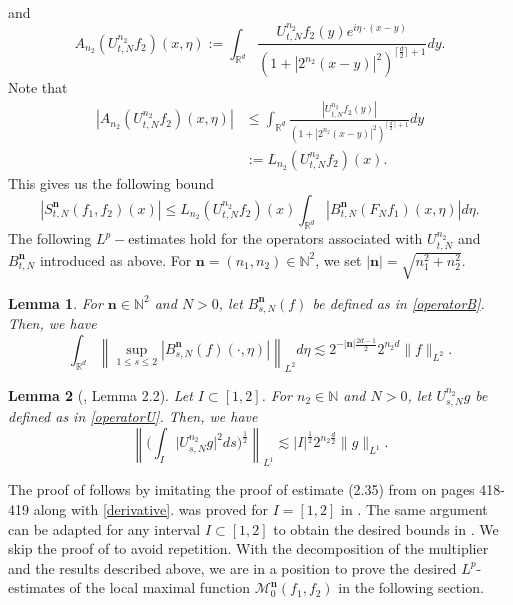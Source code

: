 \documentclass[a4paper,reqno]{amsart}
\newtheorem{lemma}{Lemma}[section]
\newcounter{old}
\numberwithin{equation}{section}
\newcommand{\N}{{\mathbb N}}
\begin{document}
	and
	\[A_{n_2}\left(U^{n_2}_{t,N}f_2\right)(x,\eta):=\int_{\mathbb{R}^{d}} \frac{U^{n_2}_{t,N}f_2(y)e^{i\eta\cdot(x-y)}}{\left(1+\left|2^{n_2}(x-y)\right|^{2}\right)^{\lceil \frac{d}{2}\rceil+1}} d y.\]
	Note that
	\begin{align*}
		\left|A_{n_2}\left(U^{n_2}_{t,N}f_2\right)(x,\eta)\right|&\leq\int_{\mathbb{R}^{d}} \frac{|U^{n_2}_{t,N}f_2(y)|}{\left(1+\left|2^{n_2}(x-y)\right|^{2}\right)^{\lceil \frac{d}{2}\rceil+1}} d y\\
		&:=L_{n_2}\left(U_{t,N}^{n_2}f_2\right)(x).
	\end{align*}
	This gives us the following bound
	\begin{equation}\label{decomposition}
		|S^{\mathbf{n}}_{t,N}(f_1,f_2)(x)|\leq L_{n_2}\left(U_{t,N}^{n_2}f_2\right)(x) \int_{\mathbb{R}^{d}}\left|B^{\mathbf{n}}_{t,N}\left(F_Nf_1\right)(x, \eta)\right| d \eta.
	\end{equation}
	The following $L^p-$estimates hold for the operators associated with $U_{t,N}^{n_2}$ and $B^{\mathbf{n}}_{t,N}$ introduced as above. For $\mathbf{n}=(n_1,n_2)\in\N^2$, we set $|\mathbf{n}|=\sqrt{n_1^2+n_2^2}$.
	\begin{lemma}\label{bn}
		For $\mathbf{n}\in\N^2$ and $N>0$, let $B^{\mathbf{n}}_{s, N}(f)$ be defined as in \eqref{operatorB}. Then, we have
		\[\int_{\mathbb{R}^{d}} \left\|\sup_{1 \leq s\leq 2}\left|B^{\mathbf{n}}_{s, N}\left(f\right)(\cdot, \eta)\right|\right\|_{L^2} d \eta\lesssim2^{-|\mathbf{n}|\frac{2d-1}{2}}2^{n_2d}\|f\|_{L^2}.\]
	\end{lemma}
	
	\begin{lemma}[\cite{HHY}, Lemma 2.2]\label{u1}
		Let $I\subset[1,2]$. For $n_2\in\N$ and $N>0$, let $U_{s,N}^{n_2}g$ be defined as in \eqref{operatorU}. Then, we have
		\[\left\|\bigg(\int_{I} \big|U_{s,N}^{n_2}g\big|^2 ds\bigg)^{\frac{1}{2}}\right\|_{L^1}\lesssim|I|^{\frac{1}{2}}2^{n_2\frac{d}{2}}\|g\|_{L^1}.\]
	\end{lemma}
	The proof of  follows by imitating the proof of estimate (2.35) from \cite{HHY} on pages 418-419 along with \eqref{derivative}.  was proved for $I=[1,2]$ in \cite{HHY}. The same argument can be adapted for any interval $I\subset[1,2]$ to obtain the desired bounds in . We skip the proof of  to avoid repetition. With the decomposition of the multiplier and the results described above, we are in a position to prove the desired $L^p$-estimates of the local maximal function $\mathcal{M}^{\mathbf{n}}_0(f_1,f_2)$ in the following section.
	
\end{document}
